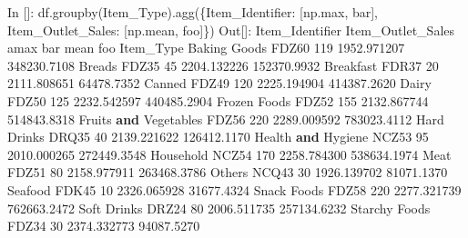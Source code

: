 \documentclass[
]{book}
\newenvironment{Shaded}{\begin{snugshade}}{\end{snugshade}}
\newcommand{\BuiltInTok}[1]{#1}
\newcommand{\DecValTok}[1]{\textcolor[rgb]{0.00,0.00,0.81}{#1}}
\newcommand{\FloatTok}[1]{\textcolor[rgb]{0.00,0.00,0.81}{#1}}
\newcommand{\KeywordTok}[1]{\textcolor[rgb]{0.13,0.29,0.53}{\textbf{#1}}}
\newcommand{\NormalTok}[1]{#1}
\newcommand{\StringTok}[1]{\textcolor[rgb]{0.31,0.60,0.02}{#1}}
\begin{document}
\begin{Shaded}
\begin{Highlighting}[]
\NormalTok{In []: df.groupby(}\StringTok{\textquotesingle{}Item\_Type\textquotesingle{}}\NormalTok{).agg(\{}\StringTok{\textquotesingle{}Item\_Identifier\textquotesingle{}}\NormalTok{: [np.}\BuiltInTok{max}\NormalTok{, bar], }\StringTok{\textquotesingle{}Item\_Outlet\_Sales\textquotesingle{}}\NormalTok{: [np.mean, foo]\})}
\NormalTok{Out[]:}
\NormalTok{                      Item\_Identifier      Item\_Outlet\_Sales             }
\NormalTok{                                 amax  bar              mean          foo}
\NormalTok{Item\_Type                                                                }
\NormalTok{Baking Goods                    FDZ60  }\DecValTok{119}       \FloatTok{1952.971207}  \FloatTok{348230.7108}
\NormalTok{Breads                          FDZ35   }\DecValTok{45}       \FloatTok{2204.132226}  \FloatTok{152370.9932}
\NormalTok{Breakfast                       FDR37   }\DecValTok{20}       \FloatTok{2111.808651}   \FloatTok{64478.7352}
\NormalTok{Canned                          FDZ49  }\DecValTok{120}       \FloatTok{2225.194904}  \FloatTok{414387.2620}
\NormalTok{Dairy                           FDZ50  }\DecValTok{125}       \FloatTok{2232.542597}  \FloatTok{440485.2904}
\NormalTok{Frozen Foods                    FDZ52  }\DecValTok{155}       \FloatTok{2132.867744}  \FloatTok{514843.8318}
\NormalTok{Fruits }\KeywordTok{and}\NormalTok{ Vegetables           FDZ56  }\DecValTok{220}       \FloatTok{2289.009592}  \FloatTok{783023.4112}
\NormalTok{Hard Drinks                     DRQ35   }\DecValTok{40}       \FloatTok{2139.221622}  \FloatTok{126412.1170}
\NormalTok{Health }\KeywordTok{and}\NormalTok{ Hygiene              NCZ53   }\DecValTok{95}       \FloatTok{2010.000265}  \FloatTok{272449.3548}
\NormalTok{Household                       NCZ54  }\DecValTok{170}       \FloatTok{2258.784300}  \FloatTok{538634.1974}
\NormalTok{Meat                            FDZ51   }\DecValTok{80}       \FloatTok{2158.977911}  \FloatTok{263468.3786}
\NormalTok{Others                          NCQ43   }\DecValTok{30}       \FloatTok{1926.139702}   \FloatTok{81071.1370}
\NormalTok{Seafood                         FDK45   }\DecValTok{10}       \FloatTok{2326.065928}   \FloatTok{31677.4324}
\NormalTok{Snack Foods                     FDZ58  }\DecValTok{220}       \FloatTok{2277.321739}  \FloatTok{762663.2472}
\NormalTok{Soft Drinks                     DRZ24   }\DecValTok{80}       \FloatTok{2006.511735}  \FloatTok{257134.6232}
\NormalTok{Starchy Foods                   FDZ34   }\DecValTok{30}       \FloatTok{2374.332773}   \FloatTok{94087.5270}
\end{Highlighting}
\end{Shaded}
\end{document}
